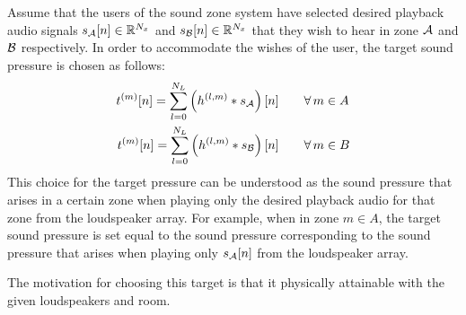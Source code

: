 Assume that the users of the sound zone system have selected desired playback audio signals $s_{\mathcal{A}}[n]\in\mathbb{R}^{N_x}$ and
$s_{\mathcal{B}}[n]\in\mathbb{R}^{N_x}$ that they wish to hear in zone $\mathcal{A}$ and $\mathcal{B}$ respectively.
In order to accommodate the wishes of the user, the target sound pressure is chosen as follows: 
\begin{align}
    t^{(m)}[n] = \sum_{l=0}^{N_L} \left(h^{(l,m)} \ast s_{\mathcal{A}}\right)[n]\qquad &\forall\,m\in A\\
    t^{(m)}[n] = \sum_{l=0}^{N_L} \left(h^{(l,m)} \ast s_{\mathcal{B}}\right)[n]\qquad &\forall\,m\in B
\end{align}
This choice for the target pressure can be understood as the sound pressure that arises in a certain zone
when playing only the desired playback audio for that zone from the loudspeaker array. 
For example, when in zone $m\in A$, the target sound pressure is set equal to the sound pressure corresponding to 
the sound pressure that arises when playing only $s_{\mathcal{A}}[n]$ from the loudspeaker array.

The motivation for choosing this target is that it physically attainable with the given loudspeakers and room.
